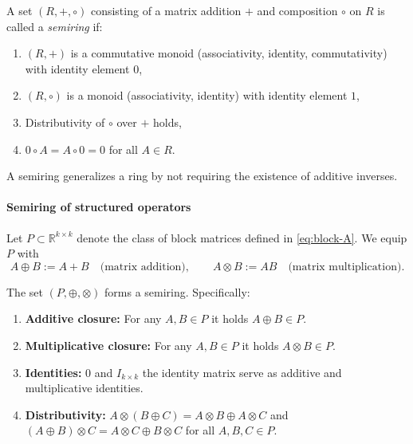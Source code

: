 \begin{defn}[Semiring]
A set $(R, +, \circ)$  consisting of a matrix addition $+$ and composition $\circ$ on $R$ is called a \emph{semiring} if:
\begin{enumerate}
    \item $(R, +)$ is a commutative monoid (associativity, identity, commutativity) with identity element $0$,
    \item $(R, \circ)$ is a monoid (associativity, identity) with identity element $1$,
    \item Distributivity of $\circ$ over $+$ holds,
    \item $0 \circ A = A \circ 0 = 0$ for all $A \in R$.
\end{enumerate}

A semiring generalizes a ring by not requiring the existence of additive inverses.
\end{defn}

\paragraph{Semiring of structured operators}

Let $P \subset \mathbb{R}^{k \times k}$ denote the class of block matrices defined in \eqref{eq:block-A}. We equip $P$ with
\[
A \oplus B := A + B \quad \text{(matrix addition)}, \qquad
A \otimes B := A B \quad \text{(matrix multiplication)}.
\]

\begin{prop}
The set $(P, \oplus, \otimes)$ forms a semiring. Specifically:
\begin{enumerate}
    \item \textbf{Additive closure:} For any $A,B \in P$ it holds $A \oplus B \in P$.
    \item \textbf{Multiplicative closure:} For any $A,B \in P$ it holds $A \otimes B \in P$.
    \item \textbf{Identities:} $0$ and $I_{k\times k}$ the identity matrix serve as additive and multiplicative identities.
    \item \textbf{Distributivity:} $A \otimes (B \oplus C) = A \otimes B \oplus A \otimes C$ and $(A \oplus B) \otimes C = A \otimes C \oplus B \otimes C$ for all $A,B,C \in P$.
\end{enumerate}
\end{prop}

